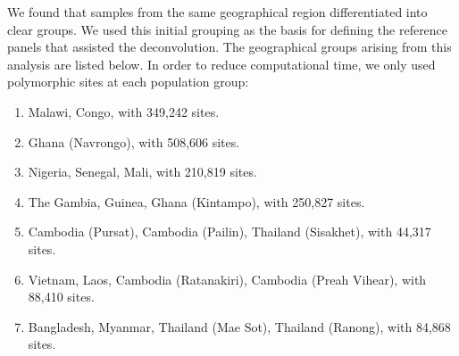 \documentclass[9pt]{article}
\begin{document}
We found that samples from the same geographical region differentiated into clear groups. We used this initial grouping as the basis for defining the reference panels that assisted the deconvolution. The geographical groups arising from this analysis are listed below. In order to reduce computational time, we only used polymorphic sites at each population group:
\begin{enumerate}
  \item Malawi, Congo, with 349,242 sites.
  \item Ghana (Navrongo), with 508,606 sites.
  \item Nigeria, Senegal, Mali, with 210,819 sites.
  \item The Gambia, Guinea, Ghana (Kintampo), with 250,827 sites.
  \item Cambodia (Pursat), Cambodia (Pailin), Thailand (Sisakhet), with 44,317 sites.
  \item Vietnam, Laos, Cambodia (Ratanakiri), Cambodia (Preah Vihear), with 88,410 sites.
  \item Bangladesh, Myanmar, Thailand (Mae Sot), Thailand (Ranong), with 84,868 sites.
\end{enumerate}





\end{document}
